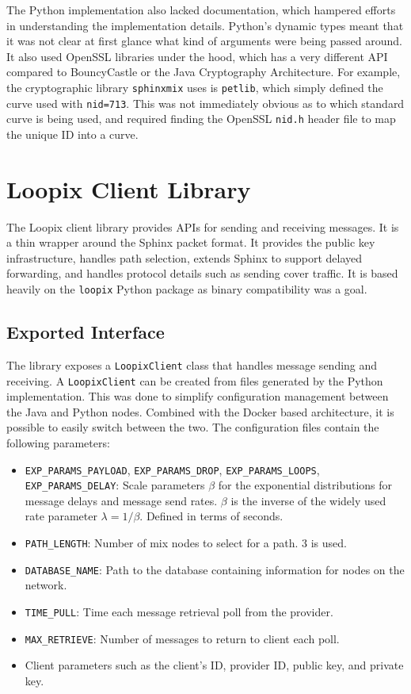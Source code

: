 \documentclass[final,dissertation.tex]{subfiles}
\begin{document}
The Python implementation also lacked documentation, which hampered efforts in understanding the implementation details. Python's dynamic types meant that it was not clear at first glance what kind of arguments were being passed around.  It also used OpenSSL libraries under the hood, which has a very different API compared to BouncyCastle or the Java Cryptography Architecture. For example, the cryptographic library \verb|sphinxmix| uses is \verb|petlib|, which simply defined the curve used with \verb|nid=713|. This was not immediately obvious as to which standard curve is being used, and required finding the OpenSSL \verb|nid.h| header file to map the unique ID into a curve.

\section{Loopix Client Library}

The Loopix client library provides APIs for sending and receiving messages. It is a thin wrapper around the Sphinx packet format. It provides the public key infrastructure, handles path selection, extends Sphinx to support delayed forwarding, and handles protocol details such as sending cover traffic. It is based heavily on the \verb|loopix| Python package as binary compatibility was a goal.

\subsection{Exported Interface}

The library exposes a \verb|LoopixClient| class that handles message sending and receiving. A \verb|LoopixClient| can be created from files generated by the Python implementation. This was done to simplify configuration management between the Java and Python nodes. Combined with the Docker based architecture, it is possible to easily switch between the two. The configuration files contain the following parameters:

\begin{itemize}
	\setlength\itemsep{0em}
	\item \verb|EXP_PARAMS_PAYLOAD|, \verb|EXP_PARAMS_DROP|, \verb|EXP_PARAMS_LOOPS|, \verb|EXP_PARAMS_DELAY|: Scale parameters $\beta$ for the exponential distributions for message delays and message send rates. $\beta$ is the inverse of the widely used rate parameter $\lambda = 1/\beta$. Defined in terms of seconds.
	\item \verb|PATH_LENGTH|: Number of mix nodes to select for a path. 3 is used.
	\item \verb|DATABASE_NAME|: Path to the database containing information for nodes on the network.
	\item \verb|TIME_PULL|: Time each message retrieval poll from the provider.
	\item \verb|MAX_RETRIEVE|: Number of messages to return to client each poll.
	\item Client parameters such as the client's ID, provider ID, public key, and private key.
\end{itemize} 
\end{document}
